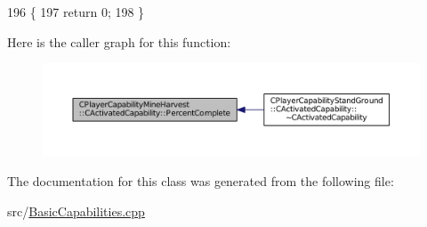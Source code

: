 \begin{DoxyCode}
196                                                                             \{
197     \textcolor{keywordflow}{return} 0;
198 \}
\end{DoxyCode}
Here is the caller graph for this function\+:\nopagebreak
\begin{figure}[H]
\begin{center}
\leavevmode
\includegraphics[width=350pt]{classCPlayerCapabilityMineHarvest_1_1CActivatedCapability_ac198166a008306dc543ceed94baaf4a3_icgraph}
\end{center}
\end{figure}


The documentation for this class was generated from the following file\+:\begin{DoxyCompactItemize}
\item 
src/\hyperlink{BasicCapabilities_8cpp}{Basic\+Capabilities.\+cpp}\end{DoxyCompactItemize}
